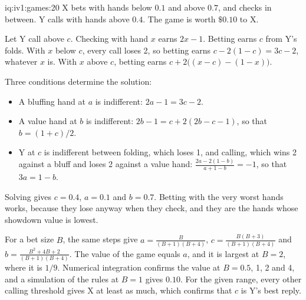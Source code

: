 \begin{solution}{iq:iv1:games:20}
X bets with hands below $0.1$ and above $0.7$, and checks in between. Y calls with hands above $0.4$. The game is worth $\$0.10$ to X.

Let Y call above $c$. Checking with hand $x$ earns $2x - 1$. Betting earns $c$ from Y's folds. With $x$ below $c$, every call loses 2, so betting earns $c - 2(1 - c) = 3c - 2$, whatever $x$ is. With $x$ above $c$, betting earns $c + 2\bigl((x - c) - (1 - x)\bigr)$.

Three conditions determine the solution:
\begin{itemize}
\item A bluffing hand at $a$ is indifferent: $2a - 1 = 3c - 2$.
\item A value hand at $b$ is indifferent: $2b - 1 = c + 2(2b - c - 1)$, so that $b = (1 + c)/2$.
\item Y at $c$ is indifferent between folding, which loses 1, and calling, which wins 2 against a bluff and loses 2 against a value hand: $\frac{2a - 2(1 - b)}{a + 1 - b} = -1$, so that $3a = 1 - b$.
\end{itemize}
Solving gives $c = 0.4$, $a = 0.1$ and $b = 0.7$. Betting with the very worst hands works, because they lose anyway when they check, and they are the hands whose showdown value is lowest.

For a bet size $B$, the same steps give $a = \frac{B}{(B + 1)(B + 4)}$, $c = \frac{B(B + 3)}{(B + 1)(B + 4)}$ and $b = \frac{B^2 + 4B + 2}{(B + 1)(B + 4)}$. The value of the game equals $a$, and it is largest at $B = 2$, where it is $1/9$. Numerical integration confirms the value at $B = 0.5$, 1, 2 and 4, and a simulation of the rules at $B = 1$ gives $0.10$. For the given range, every other calling threshold gives X at least as much, which confirms that $c$ is Y's best reply.

\end{solution}
